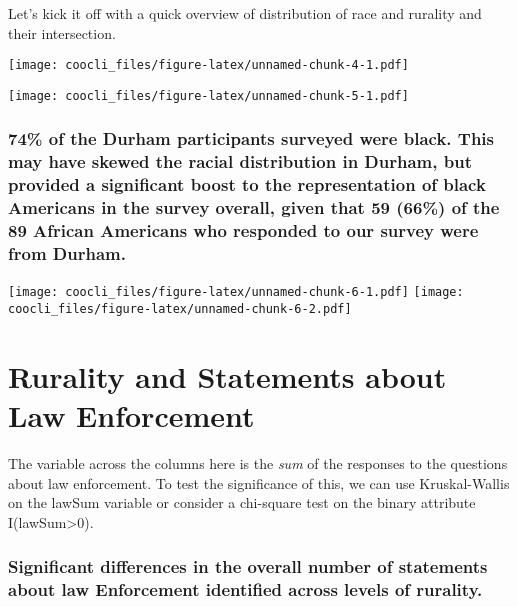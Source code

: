 \documentclass[
]{book}
\begin{document}
Let's kick it off with a quick overview of distribution of race and rurality and their intersection.

\texttt{[image: coocli\_files/figure-latex/unnamed-chunk-4-1.pdf]}

\texttt{[image: coocli\_files/figure-latex/unnamed-chunk-5-1.pdf]}

\hypertarget{of-the-durham-participants-surveyed-were-black.-this-may-have-skewed-the-racial-distribution-in-durham-but-provided-a-significant-boost-to-the-representation-of-black-americans-in-the-survey-overall-given-that-59-66-of-the-89-african-americans-who-responded-to-our-survey-were-from-durham.}{%
\subsection{74\% of the Durham participants surveyed were black. This may have skewed the racial distribution in Durham, but provided a significant boost to the representation of black Americans in the survey overall, given that 59 (66\%) of the 89 African Americans who responded to our survey were from Durham.}\label{of-the-durham-participants-surveyed-were-black.-this-may-have-skewed-the-racial-distribution-in-durham-but-provided-a-significant-boost-to-the-representation-of-black-americans-in-the-survey-overall-given-that-59-66-of-the-89-african-americans-who-responded-to-our-survey-were-from-durham.}}

\texttt{[image: coocli\_files/figure-latex/unnamed-chunk-6-1.pdf]} \texttt{[image: coocli\_files/figure-latex/unnamed-chunk-6-2.pdf]}

\hypertarget{rurality-and-statements-about-law-enforcement}{%
\chapter{Rurality and Statements about Law Enforcement}\label{rurality-and-statements-about-law-enforcement}}

The variable across the columns here is the \emph{sum} of the responses to the questions about law enforcement. To test the significance of this, we can use Kruskal-Wallis on the lawSum variable or consider a chi-square test on the binary attribute I(lawSum\textgreater0).

\hypertarget{significant-differences-in-the-overall-number-of-statements-about-law-enforcement-identified-across-levels-of-rurality.}{%
\subsection{Significant differences in the overall number of statements about law Enforcement identified across levels of rurality.}\label{significant-differences-in-the-overall-number-of-statements-about-law-enforcement-identified-across-levels-of-rurality.}}
\end{document}
